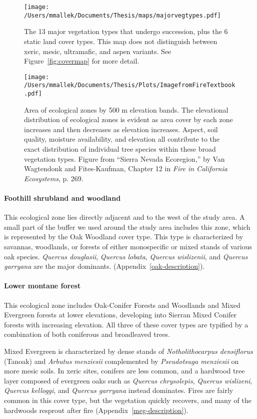 \begin{figure}[!htbp]
\texttt{[image: /Users/mmallek/Documents/Thesis/maps/majorvegtypes.pdf]}
\caption{The 13 major vegetation types that undergo succession, plus the 6 static land cover types. This map does not distinguish between xeric, mesic, ultramafic, and aspen variants. See Figure~\ref{fig:covermap} for more detail.}
\label{majorvegtypes}
\end{figure}

\begin{figure}[!htbp]
\texttt{[image: /Users/mmallek/Documents/Thesis/Plots/ImagefromFireTextbook.pdf]}
\caption{Area of ecological zones by 500 m elevation bands. The elevational distribution of ecological zones is evident as area cover by each zone increases and then decreases as elevation increases. Aspect, soil quality, moisture availability, and elevation all contribute to the exact distribution of individual tree species within these broad vegetation types. Figure from ``Sierra Nevada Ecoregion,'' by Van Wagtendonk and Fites-Kaufman, Chapter 12 in \emph{Fire in California Ecosystems}, p. 269.}
\label{majorvegtypes}
\end{figure}

\paragraph{Foothill shrubland and woodland} This ecological zone lies directly adjacent and to the west of the study area. A small part of the buffer we used around the study area includes this zone, which is represented by the Oak Woodland cover type. This type is characterized by savannas, woodlands, or forests of either monospecific or mixed stands of various oak species. \emph{Quercus douglasii}, \emph{Quercus lobata}, \emph{Quercus wislizenii}, and \emph{Quercus garryana} are the major dominants. (Appendix~\ref{oak-description}). 

\paragraph{Lower montane forest} This ecological zone includes Oak-Conifer Forests and Woodlands and Mixed Evergreen forests at lower elevations, developing into Sierran Mixed Conifer forests with increasing elevation. All three of these cover types are typified by a combination of both coniferous and broadleaved trees. 

Mixed Evergreen is characterized by dense stands of \emph{Notholithocarpus densiflorus} (Tanoak) and \emph{Arbutus menziesii} complemented by \emph{Pseudotsuga menziesii} on more mesic soils. In xeric sites, conifers are less common, and a hardwood tree layer composed of evergreen oaks such as \emph{Quercus chrysolepis}, \emph{Quercus wislizeni}, \emph{Quercus kelloggi}, and \emph{Quercus garryana} instead dominates. Fires are fairly common in this cover type, but the vegetation quickly recovers, and many of the hardwoods resprout after fire (Appendix~\ref{meg-description}). 

